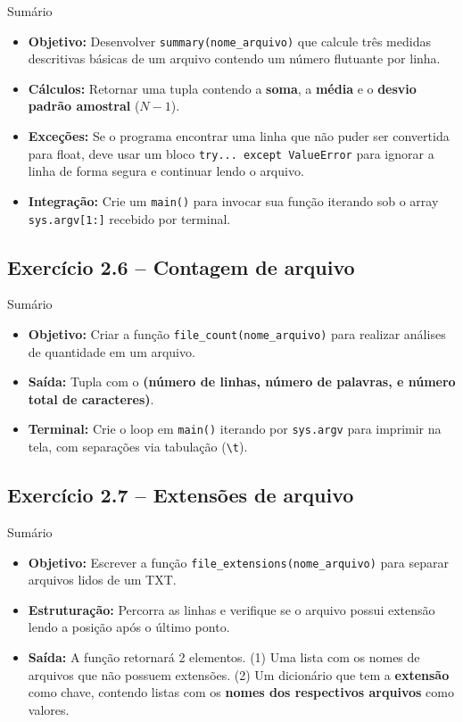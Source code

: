\documentclass[11pt,a4paper]{article}
\begin{document}
\begin{exercicio}{Sumário}
\begin{itemize}
    \item \textbf{Objetivo:} Desenvolver \texttt{summary(nome\_arquivo)} que calcule três medidas descritivas básicas de um arquivo contendo um número flutuante por linha.
    \item \textbf{Cálculos:} Retornar uma tupla contendo a \textbf{soma}, a \textbf{média} e o \textbf{desvio padrão amostral} (\(N-1\)).
    \item \textbf{Exceções:} Se o programa encontrar uma linha que não puder ser convertida para float, deve usar um bloco \texttt{try... except ValueError} para ignorar a linha de forma segura e continuar lendo o arquivo.
    \item \textbf{Integração:} Crie um \texttt{main()} para invocar sua função iterando sob o array \texttt{sys.argv[1:]} recebido por terminal.
\end{itemize}
\end{exercicio}


\subsection*{Exercício 2.6 -- Contagem de arquivo}

\begin{exercicio}{Sumário}
\begin{itemize}
    \item \textbf{Objetivo:} Criar a função \texttt{file\_count(nome\_arquivo)} para realizar análises de quantidade em um arquivo.
    \item \textbf{Saída:} Tupla com o \textbf{(número de linhas, número de palavras, e número total de caracteres)}. 
    \item \textbf{Terminal:} Crie o loop em \texttt{main()} iterando por \texttt{sys.argv} para imprimir na tela, com separações via tabulação (\texttt{\textbackslash t}).
\end{itemize}
\end{exercicio}


\subsection*{Exercício 2.7 -- Extensões de arquivo}

\begin{exercicio}{Sumário}
\begin{itemize}
    \item \textbf{Objetivo:} Escrever a função \texttt{file\_extensions(nome\_arquivo)} para separar arquivos lidos de um TXT.
    \item \textbf{Estruturação:} Percorra as linhas e verifique se o arquivo possui extensão lendo a posição após o último ponto.
    \item \textbf{Saída:} A função retornará 2 elementos. (1) Uma lista com os nomes de arquivos que não possuem extensões. (2) Um dicionário que tem a \textbf{extensão} como chave, contendo listas com os \textbf{nomes dos respectivos arquivos} como valores. 
\end{itemize}
\end{exercicio}
\end{document}
